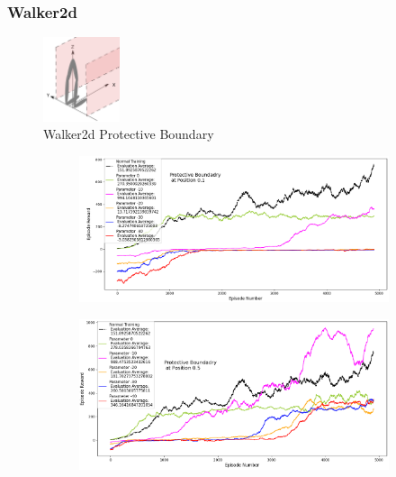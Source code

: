 \documentclass[journal]{IEEEtran}
\begin{document}
\subsubsection{Walker2d}

\begin{figure}
     \centering
      \includegraphics[width=0.2\textwidth]{walker.png}
      \caption{Walker2d Protective Boundary}
      \label{fig:walkerPB}
\end{figure}

\begin{figure}
    \centering
    \begin{subfigure}[b]{0.5\textwidth}
      \centering
      \includegraphics[width=\textwidth]{Walker_with_Boundary_at_0.1.png}
    \end{subfigure}
    \vspace*{0.0mm}
    \begin{subfigure}[b]{0.5\textwidth}
      \centering
      \includegraphics[width=\textwidth]{Walker_with_Boundary_at_0.5.png}

\end{subfigure}
\end{figure}
\end{document}
